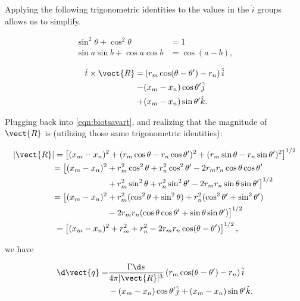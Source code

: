 \noindent Applying the following trigonometric identities to the values in the \(\hat{i}\) groups allows us to simplify.

\begin{align}
\sin^2 \theta + \cos^2 \theta &= 1 \\
\sin a \sin b + \cos a \cos b &= \cos(a-b),
\end{align}

\begin{equation}
	\begin{split}
		\hat{t} \times \vect{R} =& \left(r_m \cos(\theta-\theta') - r_n \right) \hat{i} \\
		-& (x_m-x_n) \cos \theta'  \hat{j} \\
		+& (x_m-x_n) \sin \theta'  \hat{k}.
	\end{split}
\end{equation}

Plugging back into \cref{eqn:biotsavart}, and realizing that the magnitude of \(\vect{R}\) is (utilizing those same trigonometric identities):

\begin{equation}
	\begin{aligned}
		|\vect{R}| &= \left[(x_m-x_n)^2 + (r_m\cos\theta - r_n \cos\theta')^2 + (r_m \sin \theta - r_n \sin \theta')^2\right]^{1/2} \\
		&\begin{split}= \big[(x_m-x_n)^2 &+ r_m^2\cos^2\theta +r_n^2 \cos^2\theta' - 2r_mr_n\cos\theta\cos\theta' \\
			&+ r_m^2 \sin^2 \theta + r_n^2 \sin^2 \theta' - 2r_mr_n\sin\theta\sin\theta'\big]^{1/2} \end{split}\\
		&\begin{split}= \big[(x_m-x_n)^2 &+ r_m^2(\cos^2\theta + \sin^2 \theta) +r_n^2 (\cos^2\theta' + \sin^2 \theta') \\
			 & -2r_mr_n (\cos\theta\cos\theta'+ \sin\theta\sin\theta')\big]^{1/2} \end{split} \\
		&= \left[(x_m-x_n)^2 + r_m^2 + r_n^2 - 2 r_m r_n \cos(\theta-\theta')\right]^{1/2},
	\end{aligned}
\end{equation}

\noindent we have

\begin{equation}
	\begin{split}
	\d \vect{q} =& \frac{\Gamma \d s }{4\pi|\vect{R}|^3} \left(r_m \cos(\theta-\theta') - r_n \right) \hat{i} \\
	&- (x_m-x_n) \cos \theta'  \hat{j}
	+ (x_m-x_n) \sin \theta'  \hat{k}.
	\end{split}
\end{equation}

